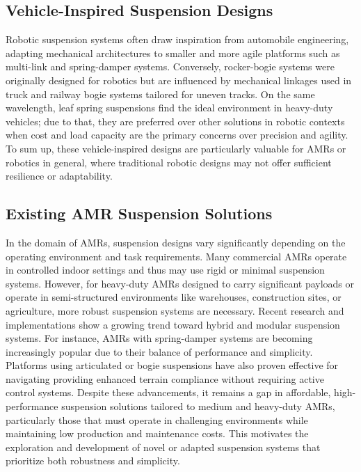 \documentclass[11pt]{article}
\begin{document}
\subsection{Vehicle-Inspired Suspension Designs}
Robotic suspension systems often draw inspiration from automobile engineering, adapting mechanical architectures to smaller and more agile platforms such as multi-link and spring-damper systems.
Conversely, rocker-bogie systems were originally designed for robotics but are influenced by mechanical linkages used in truck and railway bogie systems tailored for uneven tracks. 
On the same wavelength, leaf spring suspensions find the ideal environment in heavy-duty vehicles; due to that, they are preferred over other solutions in robotic contexts when cost and load capacity are the primary concerns over precision and agility. 
To sum up, these vehicle-inspired designs are particularly valuable for AMRs or robotics in general, where traditional robotic designs may not offer sufficient resilience or adaptability. 

\subsection{Existing AMR Suspension Solutions}
In the domain of AMRs, suspension designs vary significantly depending on the operating environment and task requirements. Many commercial AMRs operate in controlled indoor settings and thus may use rigid or minimal suspension systems. However, for heavy-duty AMRs designed to carry significant payloads or operate in semi-structured environments like warehouses, construction sites, or agriculture, more robust suspension systems are necessary.
Recent research and implementations show a growing trend toward hybrid and modular suspension systems. For instance, AMRs with spring-damper systems are becoming increasingly popular due to their balance of performance and simplicity. Platforms using articulated or bogie suspensions have also proven effective for navigating providing enhanced terrain compliance without requiring active control systems.
Despite these advancements, it remains a gap in affordable, high-performance suspension solutions tailored to medium and heavy-duty AMRs, particularly those that must operate in challenging environments while maintaining low production and maintenance costs. This motivates the exploration and development of novel or adapted suspension systems that prioritize both robustness and simplicity.

\newpage
\end{document}
